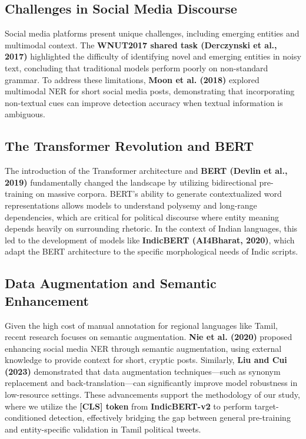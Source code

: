 \documentclass[12pt,a4paper]{article}
\begin{document}
\subsection{Challenges in Social Media Discourse}
Social media platforms present unique challenges, including emerging entities and multimodal context. The \textbf{WNUT2017 shared task (Derczynski et al., 2017)} highlighted the difficulty of identifying novel and emerging entities in noisy text, concluding that traditional models perform poorly on non-standard grammar. To address these limitations, \textbf{Moon et al. (2018)} explored multimodal NER for short social media posts, demonstrating that incorporating non-textual cues can improve detection accuracy when textual information is ambiguous.



\subsection{The Transformer Revolution and BERT}
The introduction of the Transformer architecture and \textbf{BERT (Devlin et al., 2019)} fundamentally changed the landscape by utilizing bidirectional pre-training on massive corpora. BERT's ability to generate contextualized word representations allows models to understand polysemy and long-range dependencies, which are critical for political discourse where entity meaning depends heavily on surrounding rhetoric. In the context of Indian languages, this led to the development of models like \textbf{IndicBERT (AI4Bharat, 2020)}, which adapt the BERT architecture to the specific morphological needs of Indic scripts.

\subsection{Data Augmentation and Semantic Enhancement}
Given the high cost of manual annotation for regional languages like Tamil, recent research focuses on semantic augmentation. \textbf{Nie et al. (2020)} proposed enhancing social media NER through semantic augmentation, using external knowledge to provide context for short, cryptic posts. Similarly, \textbf{Liu and Cui (2023)} demonstrated that data augmentation techniques—such as synonym replacement and back-translation—can significantly improve model robustness in low-resource settings. These advancements support the methodology of our study, where we utilize the \textbf{[CLS] token} from \textbf{IndicBERT-v2} to perform target-conditioned detection, effectively bridging the gap between general pre-training and entity-specific validation in Tamil political tweets.
\end{document}
